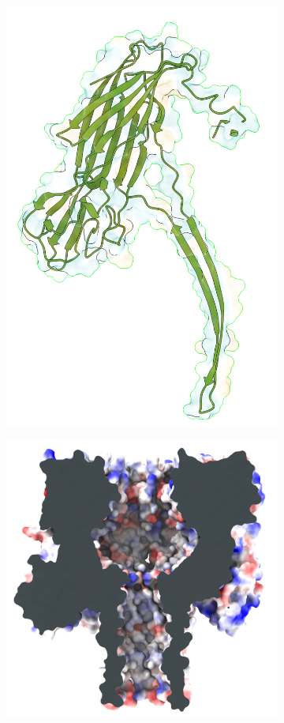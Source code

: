 \begin{figure}[ht!]
\begin{centering}
  \vspace{1.cm}

  \begin{subfigure}[t]{\dimexpr.4\linewidth-1.3em\relax}
  \centering
  \includegraphics[width=.7\linewidth,valign=t]{Figures/ahl-mon-c.png}
  \end{subfigure}
  \begin{subfigure}[t]{\dimexpr.4\linewidth-1.3em\relax}
  \centering
  \includegraphics[width=\linewidth,valign=t]{Figures/ahl-elec.png}
  \end{subfigure}%



\end{centering}
\end{figure}

